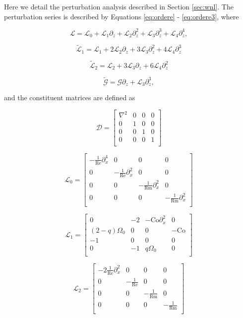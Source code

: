 \documentclass[twocolumn]{aastex61}
\newcommand{\beq}{\begin{equation}}
\newcommand{\eeq}{\end{equation}}
\newcommand\reye{\mathrm{Re}}
\newcommand\reym{\mathrm{Rm}}
\newcommand{\Co}{\mathrm{Co}}
\begin{document}
Here we detail the perturbation analysis described in Section \ref{sec:wnl}. The perturbation series is described by Equations \ref{eq:ordere} - \ref{eq:ordere3}, where 

\beq
\mathcal{L} = \mathcal{L}_0 + \mathcal{L}_1 \partial_z + \mathcal{L}_2 \partial_z^2 + \mathcal{L}_3 \partial_z^3 + \mathcal{L}_4 \partial_z^4,
\eeq

\beq
\widetilde{\mathcal{L}}_1 =  \mathcal{L}_1 + 2\mathcal{L}_2\partial_z + 3\mathcal{L}_3\partial_z^2 + 4\mathcal{L}_4\partial_z^3
\eeq

\beq
\widetilde{\mathcal{L}}_2 = \mathcal{L}_2 + 3\mathcal{L}_3\partial_z + 6\mathcal{L}_4\partial_z^2
\eeq

\beq
\widetilde{\mathcal{G}} = \mathcal{G} \partial_z + \mathcal{L}_3 \partial_z^3,
\eeq

and the constituent matrices are defined as 

\beq
\mathcal{D} = \left[\begin{matrix}
\nabla^2 & 0 & 0 & 0 \\
0 & 1& 0 & 0 \\
0 & 0 & 1 & 0\\
0 & 0 & 0 & 1 \\
\end{matrix}\right]
\eeq

\beq
\mathcal{L}_0 = \left[\begin{matrix}
-\frac{1}{\reye}\partial_x^4 & 0 & 0 & 0 \\
0 & -\frac{1}{\reye}\partial_x^2 & 0 &0 \\
0 & 0 & -\frac{1}{\reym}\partial_x^2 & 0 \\
0 & 0 & 0 & -\frac{1}{\reym}\partial_x^2 \\ \end{matrix}\right]
\eeq

\beq
\mathcal{L}_1 = \left[\begin{matrix}
0 & -2 & -\Co\partial_x^2 & 0 \\
(2-q)\Omega_0 & 0 & 0 & -\Co \\
-1 & 0 & 0 & 0 \\
0 & -1 & q\Omega_0 & 0 \\ \end{matrix}\right] 
\eeq

\beq
\mathcal{L}_2 = \left[\begin{matrix}
-2\frac{1}{\reye} \partial_x^2 & 0 & 0 & 0 \\
0 & -\frac{1}{\reye} & 0 & 0 \\
0 & 0 & -\frac{1}{\reym} & 0 \\
0 & 0 & 0 & -\frac{1}{\reym} \\ \end{matrix}\right]
\eeq
\end{document}
